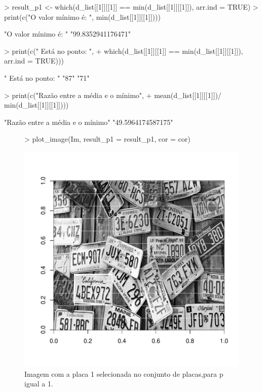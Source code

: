 \documentclass[12pt]{article}
\begin{document}
\begin{Schunk}
\begin{Sinput}
> result_p1 <- which(d_list[[1]][[1]] == min(d_list[[1]][[1]]), arr.ind = TRUE)
> print(c("O valor mínimo é: ",  min(d_list[[1]][[1]])))
\end{Sinput}
\begin{Soutput}
[1] "O valor mínimo é: " "99.8352941176471"  
\end{Soutput}
\begin{Sinput}
> print(c(" Está no ponto: ",
+         which(d_list[[1]][[1]] == min(d_list[[1]][[1]]), arr.ind = TRUE)))
\end{Sinput}
\begin{Soutput}
[1] " Está no ponto: " "87"               "71"              
\end{Soutput}
\begin{Sinput}
> print(c("Razão entre a média e o mínimo", 
+         mean(d_list[[1]][[1]])/ min(d_list[[1]][[1]])))
\end{Sinput}
\begin{Soutput}
[1] "Razão entre a média e o mínimo" "49.5964174587175"              
\end{Soutput}
\end{Schunk}

\begin{figure}
\centering
\begin{Schunk}
\begin{Sinput}
> plot_image(Im, result_p1 = result_p1, cor = cor)
\end{Sinput}
\end{Schunk}
\includegraphics{template_matching-006}
\caption{Imagem com a placa 1 selecionada no conjunto de placas,para p igual a 1.}
\label{placa1selecionada}
\end{figure}
\end{document}
